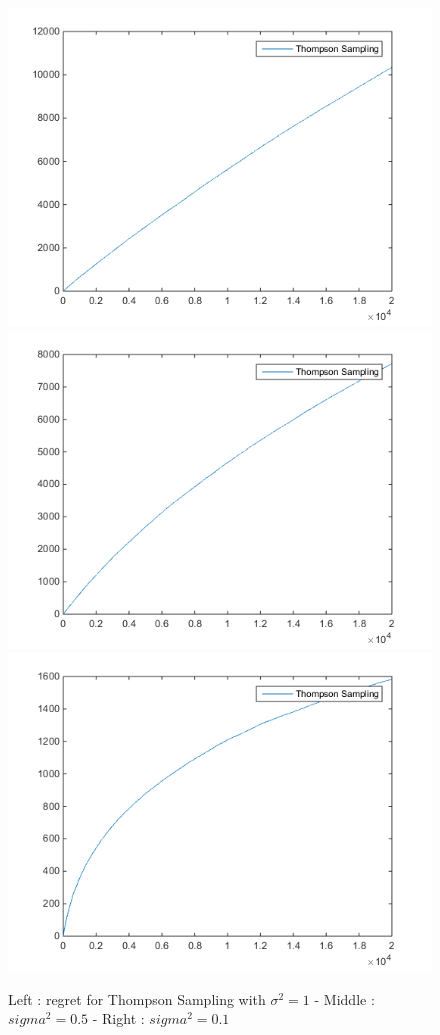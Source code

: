 \documentclass[11pt,a4paper]{article}
\begin{document}
\begin{figure}[H]
	\centering
	\noindent\includegraphics[scale=0.25]{thompson_noise1.png}
	\noindent\includegraphics[scale=0.25]{thompson_noise05.png}
	\noindent\includegraphics[scale=0.25]{thompson_noise01.png}
	\caption{Left : regret for Thompson Sampling with $\sigma^2 = 1$ - Middle : $sigma^2 = 0.5$ - Right : $sigma^2 = 0.1$}
\end{figure}
\end{document}

